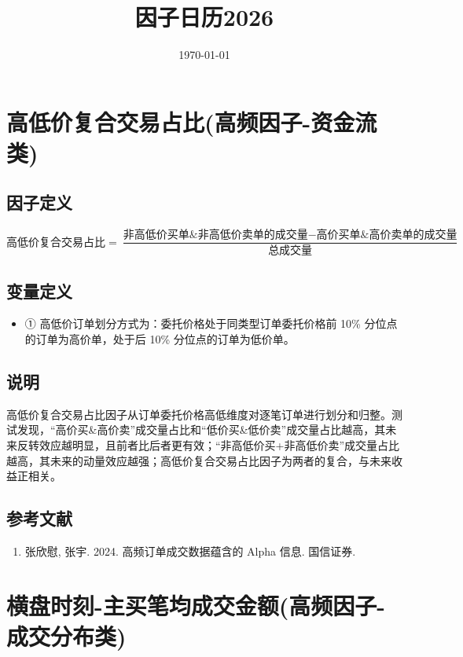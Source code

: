 \documentclass{article}
\title{因子日历2026}
\date{\today}
\begin{document}
\maketitle

\section{高低价复合交易占比(高频因子-资金流类)}

\subsection{因子定义}

\begin{equation}
    \text{高低价复合交易占比} = \frac{\text{非高低价买单\&非高低价卖单的成交量} - \text{高价买单\&高价卖单的成交量}}{\text{总成交量}}
\end{equation}

\subsection{变量定义}
\begin{itemize}
    \item ① 高低价订单划分方式为：委托价格处于同类型订单委托价格前 10\% 分位点的订单为高价单，处于后 10\% 分位点的订单为低价单。
\end{itemize}

\subsection{说明}
高低价复合交易占比因子从订单委托价格高低维度对逐笔订单进行划分和归整。测试发现，“高价买\&高价卖”成交量占比和“低价买\&低价卖”成交量占比越高，其未来反转效应越明显，且前者比后者更有效；“非高低价买+非高低价卖”成交量占比越高，其未来的动量效应越强；高低价复合交易占比因子为两者的复合，与未来收益正相关。

\subsection{参考文献}
\begin{enumerate}
    \item 张欣慰, 张宇. 2024. 高频订单成交数据蕴含的 Alpha 信息. 国信证券.
\end{enumerate}

\section{横盘时刻-主买笔均成交金额(高频因子-成交分布类)}
\end{document}
